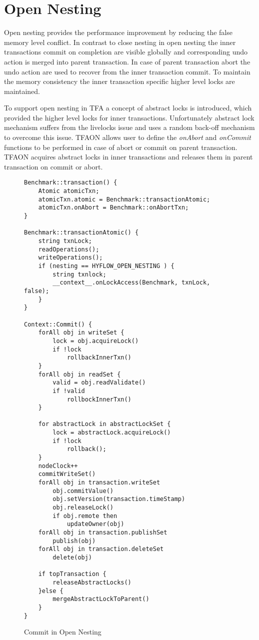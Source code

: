\documentclass[12pt,english]{report}
\begin{document}
\section{Open Nesting}

Open nesting provides the performance improvement by reducing the false memory level conflict. In contrast to close nesting in open nesting the inner transactions commit on completion are visible globally and corresponding undo action is merged into parent transaction. In case of parent transaction abort the undo action are used to recover from the inner transaction commit. To maintain the memory consistency the inner transaction specific higher level locks are maintained.  

To support open nesting in TFA a concept of abstract locks is introduced, which provided the higher level locks for inner transactions. Unfortunately abstract lock mechanism suffers from the livelocks issue and uses a random back-off mechanism to overcome this issue. TFAON allows user to define the \textit{onAbort} and \textit{onCommit} functions to be performed in case of abort or commit on parent transaction. TFAON acquires abstract locks in inner transactions and releases them in parent transaction on commit or abort. 

\begin{figure}
\begin{minipage}[b]{0.9\linewidth}\centering
\begin{lstlisting}
Benchmark::transaction() {
	Atomic atomicTxn;
	atomicTxn.atomic = Benchmark::transactionAtomic;
	atomicTxn.onAbort = Benchmark::onAbortTxn;
}

Benchmark::transactionAtomic() {
    string txnLock;
	readOperations();
	writeOperations();
	if (nesting == HYFLOW_OPEN_NESTING ) {
		string txnlock;
		__context__.onLockAccess(Benchmark, txnLock, false);	
	}
}	

Context::Commit() {
	forAll obj in writeSet {
		lock = obj.acquireLock()
		if !lock
			rollbackInnerTxn()
	}
	forAll obj in readSet {
		valid = obj.readValidate()
		if !valid
			rollbockInnerTxn()
	}
	
	for abstractLock in abstractLockSet {
		lock = abstractLock.acquireLock()
		if !lock
			rollback();
	}
	nodeClock++
	commitWriteSet()
	forAll obj in transaction.writeSet
		obj.commitValue()
 		obj.setVersion(transaction.timeStamp)
 		obj.releaseLock()
 		if obj.remote then
 			updateOwner(obj)
	forAll obj in transaction.publishSet
		publish(obj)
	forAll obj in transaction.deleteSet
		delete(obj)
		
	if topTransaction {
		releaseAbstractLocks()
	}else {
		mergeAbstractLockToParent()
	}	
}
\end{lstlisting}
\end{minipage}
\caption{Commit in Open Nesting}
\label{Fig:OpenNestingCommit}
\end{figure}
\end{document}
